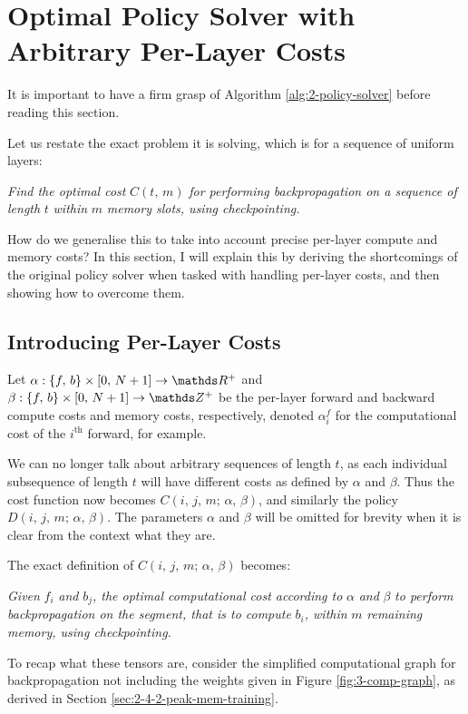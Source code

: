 \section{Optimal Policy Solver with Arbitrary Per-Layer Costs}
It is important to have a firm grasp of Algorithm \ref{alg:2-policy-solver} before reading this section.

Let us restate the exact problem it is solving, which is for a sequence of uniform layers:

\textit{Find the optimal cost }\(C(t,\,m)\)\textit{ for performing backpropagation on a sequence of length }\(t\)\textit{ within }\(m\)\textit{ memory slots, using checkpointing.}

How do we generalise this to take into account precise per-layer compute and memory costs?
In this section, I will explain this by deriving the shortcomings of the original policy solver when tasked with handling per-layer costs, and then showing how to overcome them.

\subsection{Introducing Per-Layer Costs}
Let \(\alpha : \{f,\, b\}\times[0,\, N+1] \rightarrow \R^+\) and \(\beta : \{f,\, b\}\times[0,\, N+1] \rightarrow \Z^+\) be the per-layer forward and backward compute costs and memory costs, respectively, denoted \(\alpha^f_i\) for the computational cost of the \(i^\mathrm{th}\) forward, for example.

We can no longer talk about arbitrary sequences of length \(t\), as each individual subsequence of length \(t\) will have different costs as defined by \(\alpha\) and \(\beta\).
Thus the cost function now becomes \(C(i,\, j,\, m;\, \alpha,\, \beta)\), and similarly the policy \(D(i,\, j,\, m;\, \alpha,\, \beta)\).
The parameters \(\alpha\) and \(\beta\) will be omitted for brevity when it is clear from the context what they are.

The exact definition of \(C(i,\, j,\, m;\, \alpha,\, \beta)\) becomes:

\textit{Given }\(f_i\)\textit{ and }\(b_j\)\textit{, the optimal computational cost according to }\(\alpha\)\textit{ and }\(\beta\)\textit{ to perform backpropagation on the segment, that is to compute }\(b_i\)\textit{, within }\(m\)\textit{ remaining memory, using checkpointing.}

To recap what these tensors are, consider the simplified computational graph for backpropagation not including the weights given in Figure \ref{fig:3-comp-graph}, as derived in Section \ref{sec:2-4-2-peak-mem-training}.

